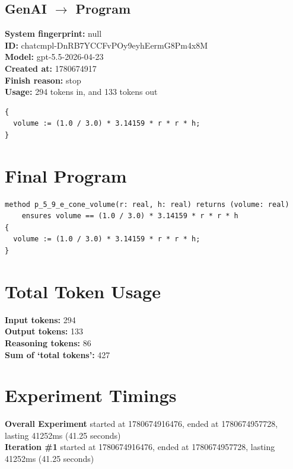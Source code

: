 \documentclass{article}
\begin{document}
\subsection*{GenAI $\rightarrow$ Program}
\textbf{System fingerprint: }null
\\\textbf{ID: }chatcmpl-DnRB7YCCFvPOy9eyhEermG8Pm4x8M
\\\textbf{Model: }gpt-5.5-2026-04-23
\\\textbf{Created at: }1780674917
\\\textbf{Finish reason: }stop
\\\textbf{Usage: }294 tokens in, and 133 tokens out
\begin{lstlisting}
{
  volume := (1.0 / 3.0) * 3.14159 * r * r * h;
}
\end{lstlisting}
\section*{Final Program}
\begin{lstlisting}
method p_5_9_e_cone_volume(r: real, h: real) returns (volume: real)
	ensures volume == (1.0 / 3.0) * 3.14159 * r * r * h
{
  volume := (1.0 / 3.0) * 3.14159 * r * r * h;
}
\end{lstlisting}
\section*{Total Token Usage}
\textbf{Input tokens: }294
\\\textbf{Output tokens: }133
\\\textbf{Reasoning tokens: }86
\\\textbf{Sum of `total tokens': }427
\section*{Experiment Timings}
\textbf{Overall Experiment} started at 1780674916476, ended at 1780674957728, lasting 41252ms (41.25 seconds)
\\\textbf{Iteration \#1} started at 1780674916476, ended at 1780674957728, lasting 41252ms (41.25 seconds)
\end{document}

